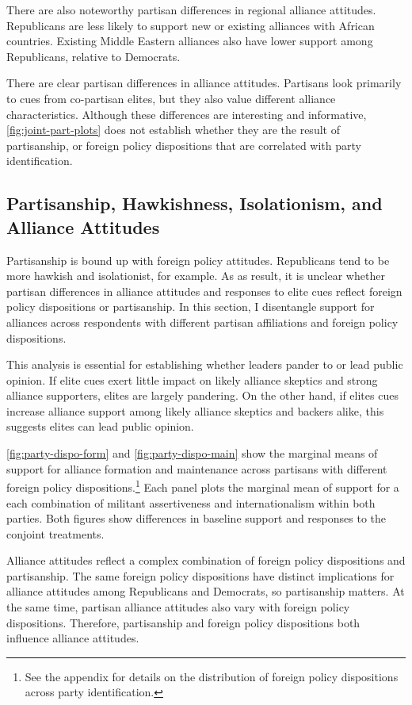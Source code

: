 \documentclass[12pt]{article}
\begin{document}
There are also noteworthy partisan differences in regional alliance attitudes.
Republicans are less likely to support new or existing alliances with African countries. 
Existing Middle Eastern alliances also have lower support among Republicans, relative to Democrats.


There are clear partisan differences in alliance attitudes. 
Partisans look primarily to cues from co-partisan elites, but they also value different alliance characteristics. 
Although these differences are interesting and informative, \autoref{fig:joint-part-plots} does not establish whether they are the result of partisanship, or foreign policy dispositions that are correlated with party identification. 


\subsection{Partisanship, Hawkishness, Isolationism, and Alliance Attitudes}


Partisanship is bound up with foreign policy attitudes. 
Republicans tend to be more hawkish and isolationist, for example.
As as result, it is unclear whether partisan differences in alliance attitudes and responses to elite cues reflect foreign policy dispositions or partisanship. 
In this section, I disentangle support for alliances across respondents with different partisan affiliations and foreign policy dispositions.  


This analysis is essential for establishing whether leaders pander to or lead public opinion. 
If elite cues exert little impact on likely alliance skeptics and strong alliance supporters, elites are largely pandering. 
On the other hand, if elites cues increase alliance support among likely alliance skeptics and backers alike, this suggests elites can lead public opinion. 


\autoref{fig:party-dispo-form} and \autoref{fig:party-dispo-main} show the marginal means of support for alliance formation and maintenance across partisans with different foreign policy dispositions.\footnote{See the appendix for details on the distribution of foreign policy dispositions across party identification.} 
Each panel plots the marginal mean of support for a each combination of militant assertiveness and internationalism within both parties. 
Both figures show differences in baseline support and responses to the conjoint treatments. 


Alliance attitudes reflect a complex combination of foreign policy dispositions and partisanship. 
The same foreign policy dispositions have distinct implications for alliance attitudes among Republicans and Democrats, so partisanship matters.
At the same time, partisan alliance attitudes also vary with foreign policy dispositions. 
Therefore, partisanship and foreign policy dispositions both influence alliance attitudes. 
\end{document}
